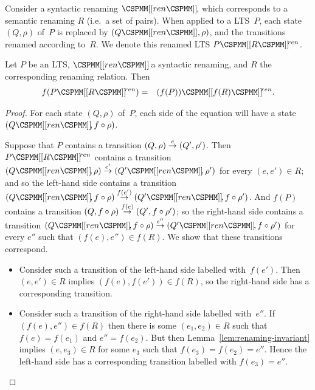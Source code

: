 


Consider a syntactic renaming $\rename{ren}$, which corresponds to a
semantic renaming $R$ (i.e.~a set of pairs).  When applied to a LTS~$P$, each
state $(Q,\rho)$ of~$P$ is replaced by $(Q\M{[[}ren\M{]]}, \rho)$, and the
transitions renamed according to~$R$.  We denote this renamed LTS
$P\rename{R}^{ren}$.
%
\begin{lemma}
\label{lem:renaming-f}
Let $P$ be an LTS, $\rename{ren}$ a syntactic renaming, and $R$ the
corresponding renaming relation.  Then
%
\begin{eqnarray*}
f(P\rename{R}^{ren}) & = & (f(P))\rename{f(R)}^{ren}.
\end{eqnarray*}
%
\end{lemma}


\begin{proof}
For each state $(Q,\rho)$ of~$P$, each side of the equation will have a
state $(Q\rename{ren}, f\after\rho)$.


Suppose that $P$ contains a transition $(Q,\rho) \stackrel{e}{\rightarrow} (Q',\rho')$.  Then
$P\rename{R}^{ren}$ contains a transition $(Q\rename{ren},\rho) \trans{e'}
(Q'\rename{ren},\rho')$ for every $(e,e') \in R$; and so the left-hand side
contains a transition $(Q\rename{ren}, f\after\rho) \trans{f(e')}
(Q'\rename{ren}, {f\after\rho'})$.  And $f(P)$ contains a transition $(Q,
f\circ\rho) \stackrel{f(e)}{\rightarrow} (Q', f\circ\rho')$; so the right-hand side contains
a transition $(Q\rename{ren}, f\after\rho) \trans{e''} (Q'\rename{ren},
{f\after\rho'})$ for every $e''$ such that $(f(e), e'') \in f(R)$.  We show
that these transitions correspond.
%
\begin{itemize}
\item Consider such a transition of the left-hand side labelled with~$f(e')$.
Then $(e,e') \in R$ implies $(f(e),f(e')) \in f(R)$, so the right-hand side
  has a corresponding transition.

\item Consider such a transition of the right-hand side labelled with~$e''$.
  If $(f(e), e'') \in f(R)$ then there is some $(e_1,e_2) \in R$ such that
  $f(e) = f(e_1)$ and $e'' = f(e_2)$.  But then
  Lemma~\ref{lem:renaming-invariant} implies $(e,e_3) \in R$ for some $e_3$
  such that $f(e_3) = f(e_2) = e''$.  Hence the left-hand side has a
  corresponding transition labelled with $f(e_3) = e''$.
\end{itemize}
\end{proof}

